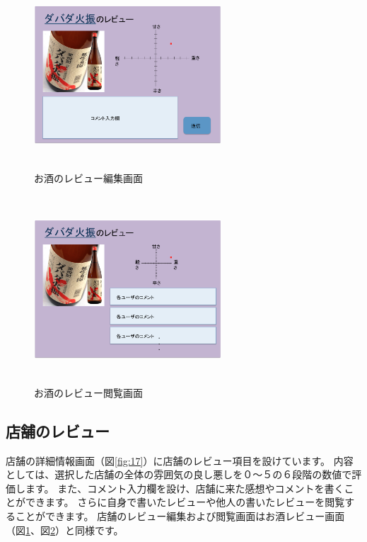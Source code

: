 \documentclass[a4j,titlepage]{jarticle}
\begin{document}
\begin {figure}[htbp]
    \begin{center}
    \includegraphics [height=7cm, width=7cm]{extrnal_design_document_image/15.eps}
    \caption {お酒のレビュー編集画面}
    \label {fig:15}
    \end{center}
\end {figure}

\begin {figure}[htbp]
    \begin{center}
    \includegraphics [height=7cm, width=7cm]{extrnal_design_document_image/16.eps}
    \caption {お酒のレビュー閲覧画面}
    \label {fig:16}
    \end{center}
\end {figure}


\subsection{店舗のレビュー}
店舗の詳細情報画面（図\ref{fig:17}）に店舗のレビュー項目を設けています。
内容としては、選択した店舗の全体の雰囲気の良し悪しを０〜５の６段階の数値で評価します。
また、コメント入力欄を設け、店舗に来た感想やコメントを書くことができます。
さらに自身で書いたレビューや他人の書いたレビューを閲覧することができます。
店舗のレビュー編集および閲覧画面はお酒レビュー画面（図\ref{fig:15}、図\ref{fig:16}）と同様です。
\end{document}
